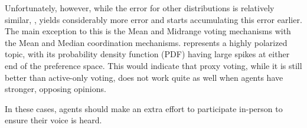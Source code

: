 Unfortunately, however, while the error for other distributions is relatively similar,
, yields considerably more error and starts accumulating
this error earlier.
The main exception to this is the Mean and Midrange voting mechanisms with the Mean
and Median coordination mechanisms.
 represents a highly polarized topic, with its probability
density function (PDF) having large spikes at either end of the preference space.
This would indicate that proxy voting, while it is still better than active-only
voting, does not work quite as well when agents have stronger, opposing opinions.  

In these cases, agents should make an extra effort to participate in-person to ensure
their voice is heard.

